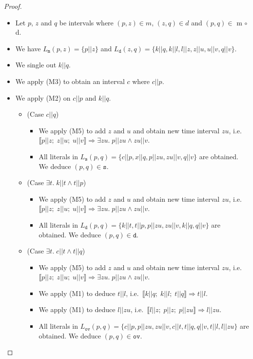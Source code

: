 \documentclass{llncs}
\begin{document}
\begin{proof}
\hfill
\begin{itemize}
\item[1.] Let $p$, $z$ and $q$ be intervals where $(p,z) \in m$, $(z,q) \in d$ and $(p,q) \in$ m $\circ$ d.
\item[2.] We have $L_{\texttt{m}}(p,z) = \{p||z\}$ and $L_{\texttt{d}}(z,q)=\{k||q, k||l, l||z, z||u, u||v, q||v\}$.
\item[3.] We single out $k||q$.
\item[4.] We apply (M3) to obtain an interval $c$ where $c||p$.
\item[5.] We apply (M2) on $c||p$ and $k||q$.
\begin{itemize}
\item[] (Case $c||q$) 
\begin{itemize}
\item We apply (M5) to add $z$ and $u$ and obtain new time interval $zu$, i.e. $\llbracket p||z; \;z||u; \; u||v \rrbracket \Longrightarrow \exists zu.\;p||zu \land zu||v$.
\item All literals in $L_\texttt{s}(p,q) = \{c||p, x||q,p||zu, zu||v, q||v\}$ are obtained. We deduce $(p,q) \in \texttt{s}$.
\end{itemize}
\item[] (Case  $\exists t.\;k||t\land t||p$)
\begin{itemize}
\item We apply (M5) to add $z$ and $u$ and obtain new time interval $zu$, i.e. $\llbracket p||z; \; z||u; \; u||v \rrbracket \Longrightarrow \exists zu.\;p||zu \land zu||v$.
\item All literals in $L_\texttt{d}(p,q) = \{k||t, t||p, p||zu, zu||v, k||q, q||v\}$ are obtained. We deduce $(p,q) \in \texttt{d}$. %
\end{itemize}
\item[] (Case $\exists t.\;c||t\land t||q$)
\begin{itemize}
\item We apply (M5) to add $z$ and $u$ and obtain new time interval $zu$, i.e. $\llbracket p||z ; \; z||u ; \; u||v \rrbracket \Longrightarrow \exists zu.\;p||zu \land zu||v$.
\item We apply (M1) to deduce $t||l$, i.e.~$\llbracket k||q ; \; k||l; \; t||q \rrbracket \Longrightarrow t||l$.
\item We apply (M1) to deduce $l||zu$, i.e.~$\llbracket l||z ; \; p||z ; \; p||zu \rrbracket \Longrightarrow l||zu$.
\item All literals in $L_{\texttt{ov}}(p,q) = \{c||p, p||zu, zu||v, c||t, t||q, q||v, t||l, l||zu\}$ are obtained. We deduce $(p,q) \in \texttt{ov}$.
\end{itemize}
\end{itemize}
\end{itemize}
\end{proof}
\end{document}
